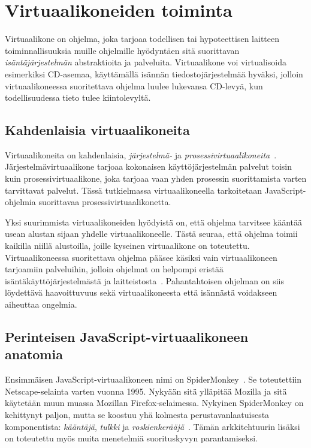\section{Virtuaalikoneiden toiminta}

Virtuaalikone on ohjelma, joka tarjoaa todellisen tai hypoteettisen laitteen toiminnallisuuksia muille ohjelmille hyödyntäen sitä suorittavan \textit{isäntäjärjestelmän} abstraktioita ja palveluita. Virtuaalikone voi virtualisoida esimerkiksi CD-asemaa, käyttämällä isännän tiedostojärjestelmää hyväksi, jolloin virtuaalikoneessa suoritettava ohjelma luulee lukevansa CD-levyä, kun todellisuudessa tieto tulee kiintolevyltä.

\pagebreak
\subsection{Kahdenlaisia virtuaalikoneita}

Virtuaalikoneita on kahdenlaisia, \textit{järjestelmä-} ja \textit{prosessivirtuaalikoneita}~\cite[s.~33]{vms}. Järjestelmävirtuaalikone tarjoaa kokonaisen käyttöjärjestelmän palvelut toisin kuin prosessivirtuaalikone, joka tarjoaa vaan yhden prosessin suorittamista varten tarvittavat palvelut. Tässä tutkielmassa virtuaalikoneella tarkoitetaan JavaScript-ohjelmia suorittavaa prosessivirtuaalikonetta.

Yksi suurimmista virtuaalikoneiden hyödyistä on, että ohjelma tarvitsee kääntää usean alustan sijaan yhdelle virtuaalikoneelle. Tästä seuraa, että ohjelma toimii kaikilla niillä alustoilla, joille kyseinen virtuaalikone on toteutettu. Virtuaalikoneessa suoritettava ohjelma pääsee käsiksi vain virtuaalikoneen tarjoamiin palveluihin, jolloin ohjelmat on helpompi eristää isäntäkäyttöjärjestelmästä ja laitteistosta~\cite[s.~36]{vms}. Pahantahtoisen ohjelman on siis löydettävä haavoittuvuus sekä virtuaalikoneesta että isännästä voidakseen aiheuttaa ongelmia.

\subsection{Perinteisen JavaScript-virtuaalikoneen anatomia}

Ensimmäisen JavaScript-virtuaalikoneen nimi on SpiderMonkey~\cite{spidermonkey}. Se toteutettiin Netscape-selainta varten vuonna 1995. Nykyään sitä ylläpitää Mozilla ja sitä käytetään muun muassa Mozillan Firefox-selaimessa. Nykyinen SpiderMonkey on kehittynyt paljon, mutta se koostuu yhä kolmesta perustavanlaatuisesta komponentista: \textit{kääntäjä}, \textit{tulkki} ja \textit{roskienkerääjä}~\cite{spidermonkeydesign}. Tämän arkkitehtuurin lisäksi on toteutettu myös muita menetelmiä suorituskyvyn parantamiseksi.

